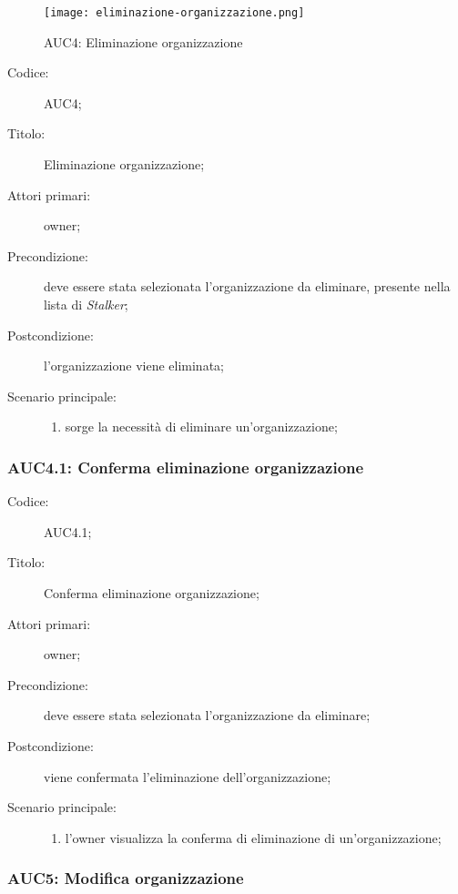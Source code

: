 \documentclass[../../../analisi-dei-requisiti.tex]{subfiles}
\begin{document}
\begin{figure}[H]
  \centering
  \texttt{[image: eliminazione-organizzazione.png]}
  \caption{AUC4: Eliminazione organizzazione}%
  \label{fig:AUC4}
\end{figure}

\begin{description}
  \item[Codice:] AUC4;
  \item[Titolo:] Eliminazione organizzazione;
  \item[Attori primari:] owner;
  \item[Precondizione:] deve essere stata selezionata l'organizzazione da eliminare, presente nella lista di \emph{Stalker};
  \item[Postcondizione:] l'organizzazione viene eliminata;
  \item[Scenario principale:]
        \begin{enumerate}
          \item sorge la necessità di eliminare un'organizzazione;
        \end{enumerate}
\end{description}

\subsubsection{AUC4.1: Conferma eliminazione organizzazione}%
\label{subs:AUC4.1}
\begin{description}
  \item[Codice:] AUC4.1;
  \item[Titolo:] Conferma eliminazione organizzazione;
  \item[Attori primari:] owner;
  \item[Precondizione:] deve essere stata selezionata l'organizzazione da eliminare;
  \item[Postcondizione:] viene confermata l'eliminazione dell'organizzazione;
  \item[Scenario principale:]
        \begin{enumerate}
          \item l'owner visualizza la conferma di eliminazione di un'organizzazione;
        \end{enumerate}
\end{description}

\subsubsection{AUC5: Modifica organizzazione}%
\label{subs:AUC5}
\end{document}
